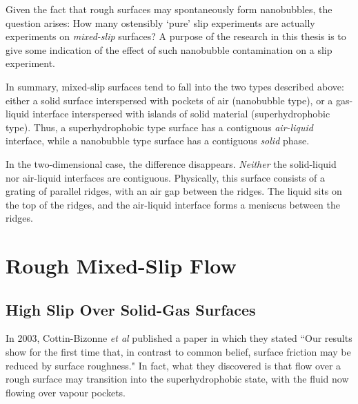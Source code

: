 \documentclass[12pt, a4paper, twoside, openright]{book}
\begin{document}

Given the fact that rough surfaces may spontaneously form nanobubbles, the question arises:  How many ostensibly `pure' slip experiments are actually experiments on \emph{mixed-slip} surfaces?
A purpose of the research in this thesis is to give some indication of the effect of such nanobubble contamination on a slip experiment.

\vspace*{1em}
In summary, mixed-slip surfaces tend to fall into the two types described above: either a solid surface interspersed with pockets of air (nanobubble type), or a gas-liquid interface interspersed with islands of solid material (superhydrophobic type).  Thus, a superhydrophobic type surface has a contiguous \emph{air-liquid} interface, while a nanobubble type surface has a contiguous \emph{solid} phase.

In the two-dimensional case, the difference disappears.  \emph{Neither} the solid-liquid nor air-liquid interfaces are contiguous.  Physically, this surface consists of a grating of parallel ridges, with an air gap between the ridges.  The liquid sits on the top of the ridges, and the air-liquid interface forms a meniscus between the ridges.

\clearpage
\section{Rough Mixed-Slip Flow}

\subsection{High Slip Over Solid-Gas Surfaces}


In 2003, Cottin-Bizonne \emph{et al} published a paper \cite{Cottin-Bizonne2003} in which they stated ``Our results show for the first time that, in contrast to common belief, surface friction may be reduced by surface roughness."  In fact, what they discovered is that flow over a rough surface may transition into the superhydrophobic state, with the fluid now flowing over vapour pockets.  
\end{document}
